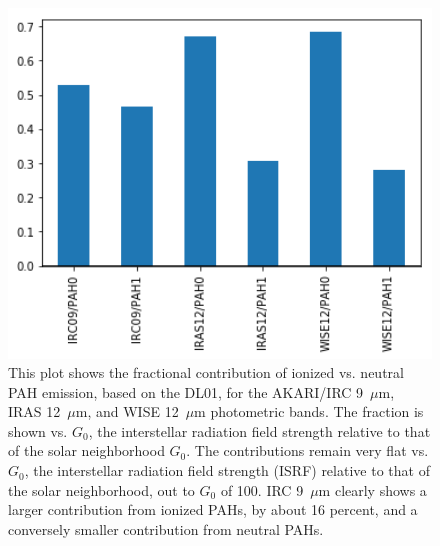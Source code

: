 \documentclass[preprint2,longabstract]{aastex}
\begin{document}
\begin{figure}
\label{fig:inband_ionfrac_bar}
\centering
\includegraphics[width=150mm]{Plots/InBandContribution_PAH_bar.png}
\caption{This plot shows the fractional contribution of ionized vs. neutral PAH emission, based on the DL01, for the AKARI/IRC 9~$\mu$m, IRAS 12~$\mu$m, and WISE 12~$\mu$m photometric bands. The fraction is shown vs. $G_{0}$, the interstellar radiation field strength relative to that of the solar neighborhood $G_{0}$. The contributions remain very flat vs. $G_{0}$, the interstellar radiation field strength (ISRF) relative to that of the solar neighborhood, out to $G_{0}$ of 100. IRC 9~$\mu$m clearly shows a larger contribution from ionized PAHs, by about 16 percent, and a conversely smaller contribution from neutral PAHs. }
\end{figure}

\end{document}
